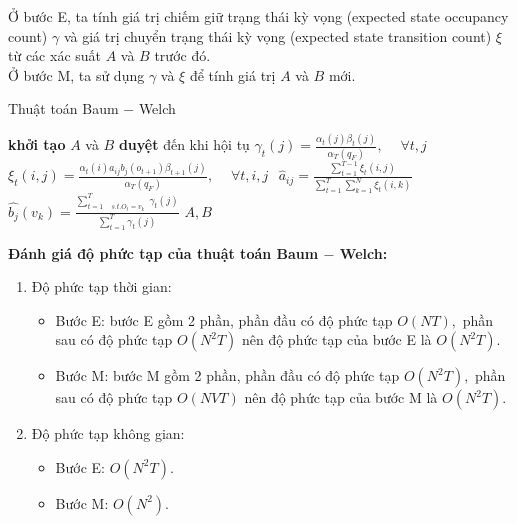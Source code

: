 Ở bước E, ta tính giá trị chiếm giữ trạng thái kỳ vọng (expected state occupancy count) $\gamma$ và giá trị chuyển trạng thái kỳ vọng (expected state transition count) $\xi$ từ các xác suất $A$ và $B$ trước đó.\\
Ở bước M, ta sử dụng $\gamma$ và $\xi$ để tính giá trị $A$ và $B$ mới.
\begin{breakablealgorithm}
  \caption{Thuật toán Baum $-$ Welch}
  \begin{algorithmic}[1]
   	\State \textbf{khởi tạo} $A$ và $B$
   	\State \textbf{duyệt} đến khi hội tụ
   	\State {}
	\State ${\gamma _t}\left( j \right) = \frac{{{\alpha _t}\left( j \right){\beta _t}\left( j \right)}}{{{\alpha _T}\left( {{q_F}} \right)}},\begin{array}{*{20}{c}}
  {}&{\forall t,j} 
\end{array}$
	\State ${\xi _t}\left( {i,j} \right) = \frac{{{\alpha _t}\left( i \right){a_{ij}}{b_j}\left( {{o_{t + 1}}} \right){\beta _{t + 1}}\left( j \right)}}{{{\alpha _T}\left( {{q_F}} \right)}},\begin{array}{*{20}{c}}
  {}&{\forall t,i,j} 
\end{array}$
     \State {}
     \State ${\widehat a_{ij}} = \frac{{\sum\limits_{t = 1}^{T - 1} {{\xi _t}\left( {i,j} \right)} }}{{\sum\limits_{t = 1}^T {\sum\limits_{k = 1}^N {{\xi _t}\left( {i,k} \right)} } }}$
     \State $\widehat {{b_j}}\left( {{v_k}} \right) = \frac{{\sum\nolimits_{t = 1\begin{array}{*{20}{c}}
  {}&{s.t.{O_t} = {v_k}} 
\end{array}}^T {{\gamma _t}\left( j \right)} }}{{\sum\nolimits_{t = 1}^T {{\gamma _t}\left( j \right)} }}$
     \State
    \Return $A, B$
    \EndFunction
  \end{algorithmic}
\end{breakablealgorithm}
\textbf{Đánh giá độ phức tạp của thuật toán Baum $-$ Welch:}
\begin{enumerate}
\item Độ phức tạp thời gian:
\begin{itemize}
\item Bước E: bước E gồm 2 phần, phần đầu có độ phức tạp $O \left( {NT} \right),$ phần sau có độ phức tạp $O \left( {N^2T} \right)$ nên độ phức tạp của bước E là $O \left( {N^2T} \right).$
\item Bước M: bước M gồm 2 phần, phần đầu có độ phức tạp $O \left( {N^2T} \right),$ phần sau có độ phức tạp $O \left( {NVT} \right)$ nên độ phức tạp của bước M là $O \left( {N^2T} \right).$
\end{itemize}
\item Độ phức tạp không gian:
\begin{itemize}
\item Bước E: $O \left( {N^2T} \right).$
\item Bước M: $O \left( {N^2} \right).$
\end{itemize}
\end{enumerate}